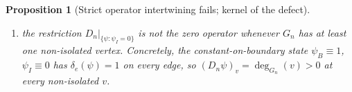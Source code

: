 \documentclass[11pt]{article}
\theoremstyle{plain}
\newtheorem{proposition}[theorem]{Proposition}
\theoremstyle{definition}
\theoremstyle{remark}
\begin{document}
\begin{proposition}[Strict operator intertwining fails; kernel of the defect]
\begin{enumerate}[label=\textup{(\roman*)}, leftmargin=2.4em, nosep, topsep=2pt]
  $\dim \ker \mathcal{B}_n = |E_n| - |V_n| + b(G_n)$, and in particular
  $\ker \mathcal{B}_n = 0$ whenever $G_n$ is a (simple) forest. The smallest
  simple-graph counterexample is $G_n = C_4$ (the $4$-cycle), where
  $\dim \ker \mathcal{B}_n = 1$ and $\ker D_n$ is strictly larger than
  $\mathrm{range}(H_{n+1})$ (a parallel-edge multigraph already has
  $\ker \mathcal{B}_n \ne 0$, but Definition~\ref{def:abstract-model} restricts
  to simple $G_n$);
\item the restriction $D_n|_{\{\psi : \psi_I = 0\}}$ is not the
  zero operator whenever $G_n$ has at least one non-isolated vertex.
  Concretely, the constant-on-boundary state $\psi_B \equiv 1$,
  $\psi_I \equiv 0$ has $\delta_e(\psi) = 1$ on every edge, so
  $(D_n \psi)_v = \deg_{G_n}(v) > 0$ at every non-isolated $v$.
\end{enumerate}
\end{proposition}
\end{document}
